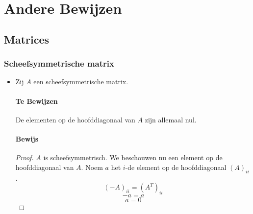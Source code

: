 \documentclass[lineaire_algebra_oplossingen.tex]{subfiles}
\begin{document}
\chapter{Andere Bewijzen}
\section{Matrices}

\subsection{Scheefsymmetrische matrix}
\begin{itemize}
\item
Zij $A$ een scheefsymmetrische matrix.
\subsubsection*{Te Bewijzen}
De elementen op de hoofddiagonaal van $A$ zijn allemaal nul.

\subsubsection*{Bewijs}
\begin{proof}
$A$ is scheefsymmetrisch. We beschouwen nu een element op de hoofddiagonaal van $A$. Noem $a$ het $i$-de element op de hoofddiagonaal $(A)_{ii}$.
\[
(-A)_{ii} = (A^T)_{ii}
\]
\[
-a = a
\]
\[
a = 0
\]
\end{proof}



\end{itemize}
\end{document}
